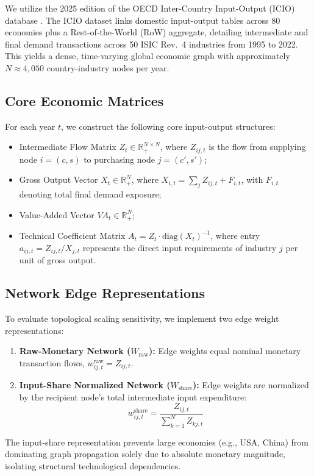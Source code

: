 \documentclass[11pt,a4paper]{article}
\newcommand{\R}{\mathbb{R}}
\begin{document}
We utilize the 2025 edition of the OECD Inter-Country Input-Output (ICIO) database \citep{oecd2025icio}. The ICIO dataset links domestic input-output tables across 80 economies plus a Rest-of-the-World (RoW) aggregate, detailing intermediate and final demand transactions across 50 ISIC Rev.\ 4 industries from 1995 to 2022. This yields a dense, time-varying global economic graph with approximately $N \approx 4,050$ country-industry nodes per year.

\subsection{Core Economic Matrices}

For each year $t$, we construct the following core input-output structures:
\begin{itemize}
    \item Intermediate Flow Matrix $Z_t \in \R_+^{N \times N}$, where $Z_{ij,t}$ is the flow from supplying node $i = (c, s)$ to purchasing node $j = (c', s')$;
    \item Gross Output Vector $X_t \in \R_+^N$, where $X_{i,t} = \sum_j Z_{ij,t} + F_{i,t}$, with $F_{i,t}$ denoting total final demand exposure;
    \item Value-Added Vector $VA_t \in \R_+^N$;
    \item Technical Coefficient Matrix $A_t = Z_t \cdot \text{diag}(X_t)^{-1}$, where entry $a_{ij,t} = Z_{ij,t} / X_{j,t}$ represents the direct input requirements of industry $j$ per unit of gross output.
\end{itemize}

\subsection{Network Edge Representations}

To evaluate topological scaling sensitivity, we implement two edge weight representations:
\begin{enumerate}
    \item \textbf{Raw-Monetary Network ($W_{\text{raw}}$):} Edge weights equal nominal monetary transaction flows, $w_{ij,t}^{\text{raw}} = Z_{ij,t}$.
    \item \textbf{Input-Share Normalized Network ($W_{\text{share}}$):} Edge weights are normalized by the recipient node's total intermediate input expenditure:
    \begin{equation}
        w_{ij,t}^{\text{share}} = \frac{Z_{ij,t}}{\sum_{k=1}^N Z_{kj,t}}
    \end{equation}
\end{enumerate}
The input-share representation prevents large economies (e.g., USA, China) from dominating graph propagation solely due to absolute monetary magnitude, isolating structural technological dependencies.
\end{document}
